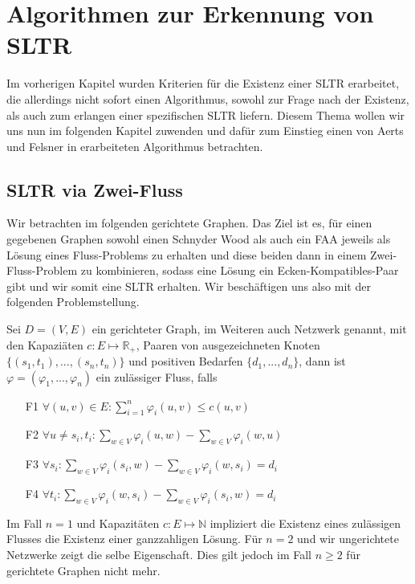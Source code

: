 \chapter{Algorithmen zur Erkennung von SLTR}

Im vorherigen Kapitel wurden Kriterien für die Existenz einer SLTR erarbeitet, die allerdings nicht sofort einen Algorithmus, sowohl zur Frage nach der Existenz, als auch zum erlangen einer spezifischen SLTR liefern. Diesem Thema wollen wir uns nun im folgenden Kapitel zuwenden und dafür zum Einstieg einen von Aerts und Felsner in \cite{af13} erarbeiteten Algorithmus betrachten.

\section{SLTR via Zwei-Fluss}

Wir betrachten im folgenden gerichtete Graphen. Das Ziel ist es, für einen gegebenen Graphen sowohl einen Schnyder Wood als auch ein FAA jeweils als Lösung eines Fluss-Problems zu erhalten und diese beiden dann in einem Zwei-Fluss-Problem zu kombinieren, sodass eine Lösung ein Ecken-Kompatibles-Paar gibt und wir somit eine SLTR erhalten. Wir beschäftigen uns also mit der folgenden Problemstellung.

\begin{definition}
Sei $D=(V,E)$ ein gerichteter Graph, im Weiteren auch Netzwerk genannt, mit den Kapaziäten $c:E\mapsto\mathbb{R}_{+}$, Paaren von ausgezeichneten Knoten $\{(s_1,t_1), ... ,(s_n,t_n)\}$ und positiven Bedarfen $\{d_1, ... ,d_n\}$, dann ist $\varphi=(\varphi_1, ... ,\varphi_n)$ ein zulässiger Fluss, falls
\begin{itemize}
\item[F1] $\forall (u,v) \in E : \sum_{i=1}^{n}{\varphi_i(u,v)} \leq c(u,v) $
\item[F2] $ \forall u \neq s_i,t_i : \sum_{w \in V} \varphi_i(u,w) - \sum_{w \in V} \varphi_i(w,u) $
\item[F3] $ \forall s_i : \sum_{w \in V} \varphi_i(s_i,w) - \sum_{w \in V} \varphi_i(w,s_i) = d_i $
\item[F4] $ \forall t_i : \sum_{w \in V} \varphi_i(w,s_i) - \sum_{w \in V} \varphi_i(s_i,w) = d_i $
\end{itemize}
\end{definition}

Im Fall $n=1$ und Kapazitäten $c:E\mapsto\mathbb{N}$ impliziert die Existenz eines zulässigen Flusses die Existenz einer ganzzahligen Lösung. Für $n=2$ und wir ungerichtete Netzwerke zeigt \cite{hu} die selbe Eigenschaft. Dies gilt jedoch im Fall $n \geq 2$ für gerichtete Graphen nicht mehr.\\

